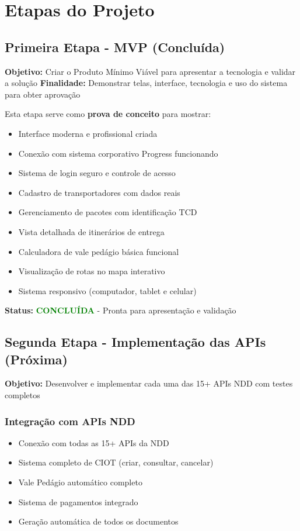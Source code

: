 \documentclass[12pt,a4paper]{article}
\begin{document}
\section{Etapas do Projeto}

\subsection{Primeira Etapa - MVP (Concluída)}
\textbf{Objetivo:} Criar o Produto Mínimo Viável para apresentar a tecnologia e validar a solução
\textbf{Finalidade:} Demonstrar telas, interface, tecnologia e uso do sistema para obter aprovação

Esta etapa serve como \textbf{prova de conceito} para mostrar:
\begin{itemize}[leftmargin=3cm]
    \item[\checkmark] Interface moderna e profissional criada
    \item[\checkmark] Conexão com sistema corporativo Progress funcionando
    \item[\checkmark] Sistema de login seguro e controle de acesso
    \item[\checkmark] Cadastro de transportadores com dados reais
    \item[\checkmark] Gerenciamento de pacotes com identificação TCD
    \item[\checkmark] Vista detalhada de itinerários de entrega
    \item[\checkmark] Calculadora de vale pedágio básica funcional
    \item[\checkmark] Visualização de rotas no mapa interativo
    \item[\checkmark] Sistema responsivo (computador, tablet e celular)
\end{itemize}

\textbf{Status:} \textcolor{green}{\textbf{CONCLUÍDA}} - Pronta para apresentação e validação

\subsection{Segunda Etapa - Implementação das APIs (Próxima)}
\textbf{Objetivo:} Desenvolver e implementar cada uma das 15+ APIs NDD com testes completos


\subsubsection{Integração com APIs NDD}
\begin{itemize}
    \item Conexão com todas as 15+ APIs da NDD
    \item Sistema completo de CIOT (criar, consultar, cancelar)
    \item Vale Pedágio automático completo
    \item Sistema de pagamentos integrado
    \item Geração automática de todos os documentos
\end{itemize}
\end{document}
